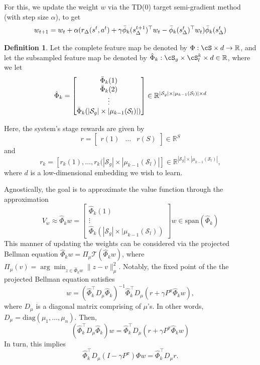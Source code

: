 \documentclass{article}
\newcommand\R{\mathbb{R}}
\theoremstyle{plain}
\theoremstyle{definition}
\newtheorem{definition}[theorem]{Definition}
\begin{document}
For this, we update the weight $w$ via the TD(0) target semi-gradient method (with step size $\alpha$), to get
\begin{equation}w_{t+1} = w_t + \alpha(r_\Delta(s^t,a^t) + \gamma\bar{\phi}_k(s^{t+1}_\Delta)^\top w_t - \bar{\phi}_k(s_\Delta^t)^\top w_t)\bar{\phi}_k(s_\Delta^t)\\ \end{equation}

\begin{definition}Let the complete feature map be denoted by $\Phi:\cS\times d \to \R$, and let the subsampled feature map be denoted by $\hat{\Phi}_k: \cS_g\times\cS_l^k\times d \in \R$, where we let
\begin{equation}\hat{\Phi}_k = \begin{bmatrix}\bar{\Phi}_k(1) \\ \bar{\Phi}_k(2)\\ \vdots \\ \bar{\Phi}_k(|\mathcal{S}_g|\times|\mu_{k-1}{(\mathcal{S}_l)}|)\end{bmatrix} \in \R^{|\mathcal{S}_g|\times |\mu_{k-1}{(\mathcal{S}_l)}|\times d}\\\end{equation}

Here, the system's stage rewards are given by \[r = \begin{bmatrix}r(1) & \dots & r(S)\end{bmatrix}\in \R^S\] and
\[r_k = [r_k(1),\dots,r_k(|\mathcal{S}_g|\times |\mu_{k-1}{(\mathcal{S}_l)}|]\in \R^{|\mathcal{S}_g|\times |\mu_{k-1}{(\mathcal{S}_l)}|},\] where $d$ is a low-dimensional embedding we wish to learn.
\end{definition}

Agnostically, the goal is to approximate the value function through the approximation \[V_w \approx \hat{\Phi}_k w = \begin{bmatrix}\hat{\Phi}_k(1) \\  \vdots \\ \hat{\Phi}_k(|\mathcal{S}_g|\times |\mu_{k-1}{(\mathcal{S}_l)})\end{bmatrix} w \in \mathrm{span}(\hat{\Phi}_k)\] This manner of updating the weights can be considered via the projected Bellman equation $\hat{\Phi}_k w = \Pi_\mu \mathcal{T}(\hat{\Phi}_k w)$, where $\Pi_\mu(v) = \arg\min_{z\in \hat{\Phi}_k w}\|z-v\|_\mu^2$. Notably, the fixed point of the the projected Bellman equation satisfies \[w = (\hat{\Phi}_k^\top D_\mu \hat{\Phi}_k)^{-1}\hat{\Phi}_k^\top D_{\mu}(r+\gamma P^\pi \hat{\Phi}_k w),\]
where $D_\mu$ is a diagonal matrix comprising of $\mu$'s. In other words, $D_{\mu}=\mathrm{diag}(\mu_1,\dots,\mu_n)$.
Then, 
\[(\hat{\Phi}_k^\top D_\mu \hat{\Phi}_k)w = \hat{\Phi}_k^\top D_\mu(r+\gamma P^\pi \hat{\Phi}_k w)
\]
In turn, this implies 
\[\hat{\Phi}_k^\top D_\mu(I-\gamma P^\pi)\Phi w = \hat{\Phi}_k^\top D_\mu r.\]
\end{document}

